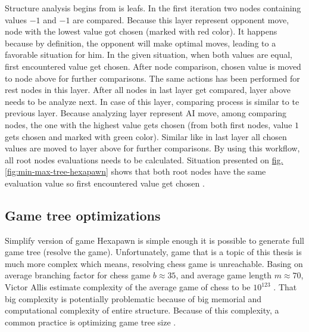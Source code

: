     Structure analysis begins from is leafs. In the first iteration two nodes containing values $-1$ and $-1$ are compared. Because this layer represent opponent move, node with the lowest value got chosen (marked with red color). It happens because by definition, the opponent will make optimal moves, leading to a favorable situation for him. In the given situation, when both values are equal, first encountered value get chosen. After node comparison, chosen value is moved to node above for further comparisons. The same actions has been performed for rest nodes in this layer. After all nodes in last layer get compared, layer above needs to be analyze next. In case of this layer, comparing process is similar to te previous layer. Because analyzing layer represent AI move, among comparing nodes, the one with the highest value gets chosen (from both first nodes, value $1$ gets chosen and marked with green color). Similar like in last layer all chosen values are moved to layer above for further comparisons. By using this workflow, all root nodes evaluations needs to be calculated. Situation presented on \hyperref[fig:min-max-tree-hexapawn]{fig. \ref*{fig:min-max-tree-hexapawn}} shows that both root nodes have the same evaluation value so first encountered value get chosen \cite{bib:article-comparizon-of-search-algorithms}.

    \subsection{Game tree optimizations}\label{sec:game-tree-optimizations}
    Simplify version of game Hexapawn is simple enough it is possible to generate full game tree (resolve the game). Unfortunately, game that is a topic of this thesis is much more complex which means, resolving chess game is unreachable. Basing on average branching factor for chess game $b \approx 35$, and average game length $m \approx 70$, Victor Allis estimate complexity of the average game of chess to be $10^{123}$ \cite{bib:book-search-for-solutions-in-games}. That big complexity is potentially problematic because of big memorial and computational complexity of entire structure. Because of this complexity, a common practice is optimizing game tree size \cite{bib:article-optimal-on-game-trees}.

